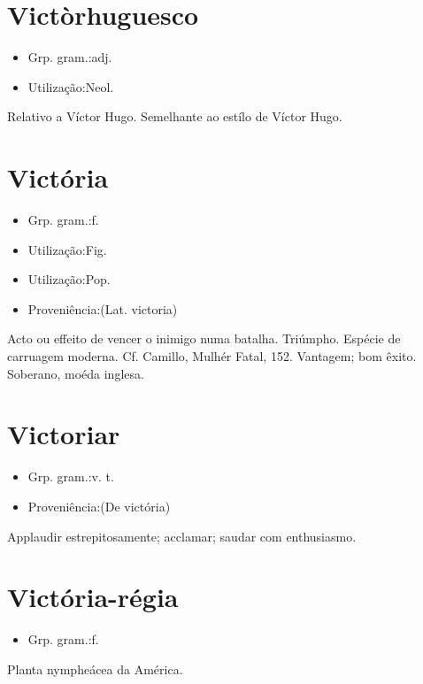 \documentclass{article}
\begin{document}
\section{Victòrhuguesco}
\begin{itemize}
\item {Grp. gram.:adj.}
\end{itemize}
\begin{itemize}
\item {Utilização:Neol.}
\end{itemize}
Relativo a Víctor Hugo.
Semelhante ao estílo de Víctor Hugo.
\section{Victória}
\begin{itemize}
\item {Grp. gram.:f.}
\end{itemize}
\begin{itemize}
\item {Utilização:Fig.}
\end{itemize}
\begin{itemize}
\item {Utilização:Pop.}
\end{itemize}
\begin{itemize}
\item {Proveniência:(Lat. \textunderscore victoria\textunderscore )}
\end{itemize}
Acto ou effeito de vencer o inimigo numa batalha.
Triúmpho.
Espécie de carruagem moderna. Cf. Camillo, \textunderscore Mulhér Fatal\textunderscore , 152.
Vantagem; bom êxito.
Soberano, moéda inglesa.
\section{Victoriar}
\begin{itemize}
\item {Grp. gram.:v. t.}
\end{itemize}
\begin{itemize}
\item {Proveniência:(De \textunderscore victória\textunderscore )}
\end{itemize}
Applaudir estrepitosamente; acclamar; saudar com enthusiasmo.
\section{Victória-régia}
\begin{itemize}
\item {Grp. gram.:f.}
\end{itemize}
Planta nympheácea da América.
\end{document}
